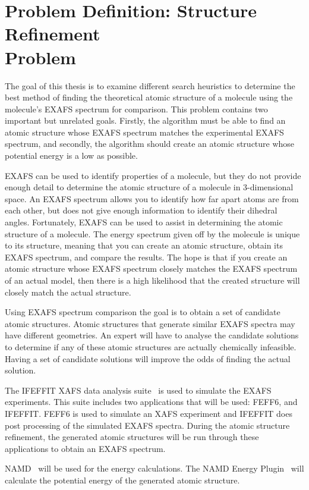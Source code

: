 \section[Problem Definition: Structure Refinement Problem]{Problem Definition: Structure Refinement\\ Problem}
\label{sec:problem-definition}

The goal of this thesis is to examine different search heuristics to determine the best method of finding the theoretical atomic structure of a molecule using the molecule's EXAFS spectrum for comparison. This problem contains two important but unrelated goals. Firstly, the algorithm must be able to find an atomic structure whose EXAFS spectrum matches the experimental EXAFS spectrum, and secondly, the algorithm should create an atomic structure whose potential energy is a low as possible.

EXAFS can be used to identify properties of a molecule, but they do not provide enough detail to determine the atomic structure of a molecule in 3-dimensional space. An EXAFS spectrum allows you to identify how far apart atoms are from each other, but does not give enough information to identify their dihedral angles. Fortunately, EXAFS can be used to assist in determining the atomic structure of a molecule. The energy spectrum given off by the molecule is unique to its structure, meaning that you can create an atomic structure, obtain its EXAFS spectrum, and compare the results. The hope is that if you create an atomic structure whose EXAFS spectrum closely matches the EXAFS spectrum of an actual model, then there is a high likelihood that the created structure will closely match the actual structure.

Using EXAFS spectrum comparison the goal is to obtain a set of candidate atomic structures. Atomic structures that generate similar EXAFS spectra may have different geometries. An expert will have to analyse the candidate solutions to determine if any of these atomic structures are actually chemically infeasible. Having a set of candidate solutions will improve the odds of finding the actual solution.

The IFEFFIT XAFS data analysis suite~\cite{ifeffit} is used to simulate the EXAFS experiments. This suite includes two applications that will be used: FEFF6, and IFEFFIT. FEFF6 is used to simulate an XAFS experiment and IFEFFIT does post processing of the simulated EXAFS spectra. During the atomic structure refinement, the generated atomic structures will be run through these applications to obtain an EXAFS spectrum.

NAMD~\cite{namd} will be used for the energy calculations. The NAMD Energy Plugin~\cite{namdEnergy}  will calculate the potential energy of the generated atomic structure.

